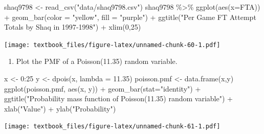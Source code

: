 \documentclass[
  11pt,
]{book}
\newenvironment{Shaded}{\begin{snugshade}}{\end{snugshade}}
\newcommand{\AttributeTok}[1]{\textcolor[rgb]{0.77,0.63,0.00}{#1}}
\newcommand{\DecValTok}[1]{\textcolor[rgb]{0.00,0.00,0.81}{#1}}
\newcommand{\FloatTok}[1]{\textcolor[rgb]{0.00,0.00,0.81}{#1}}
\newcommand{\FunctionTok}[1]{\textcolor[rgb]{0.00,0.00,0.00}{#1}}
\newcommand{\NormalTok}[1]{#1}
\newcommand{\OtherTok}[1]{\textcolor[rgb]{0.56,0.35,0.01}{#1}}
\newcommand{\SpecialCharTok}[1]{\textcolor[rgb]{0.00,0.00,0.00}{#1}}
\newcommand{\StringTok}[1]{\textcolor[rgb]{0.31,0.60,0.02}{#1}}
\providecommand{\tightlist}{%
  \setlength{\itemsep}{0pt}\setlength{\parskip}{0pt}}
\theoremstyle{definition}
\theoremstyle{definition}
\theoremstyle{definition}
\theoremstyle{definition}
\theoremstyle{remark}
\begin{document}
\begin{Shaded}
\begin{Highlighting}[]
\NormalTok{shaq9798 }\OtherTok{\textless{}{-}} \FunctionTok{read\_csv}\NormalTok{(}\StringTok{"data/shaq9798.csv"}\NormalTok{)}
\NormalTok{shaq9798 }\SpecialCharTok{\%\textgreater{}\%} \FunctionTok{ggplot}\NormalTok{(}\FunctionTok{aes}\NormalTok{(}\AttributeTok{x=}\NormalTok{FTA))  }\SpecialCharTok{+} 
  \FunctionTok{geom\_bar}\NormalTok{(}\AttributeTok{color =} \StringTok{"yellow"}\NormalTok{, }\AttributeTok{fill =} \StringTok{"purple"}\NormalTok{) }\SpecialCharTok{+}
  \FunctionTok{ggtitle}\NormalTok{(}\StringTok{"Per Game FT Attempt Totals by Shaq in 1997{-}1998"}\NormalTok{) }\SpecialCharTok{+}
  \FunctionTok{xlim}\NormalTok{(}\DecValTok{0}\NormalTok{,}\DecValTok{25}\NormalTok{)}
\end{Highlighting}
\end{Shaded}

\texttt{[image: textbook\_files/figure-latex/unnamed-chunk-60-1.pdf]}

\newpage

\begin{enumerate}
\def\labelenumi{(\alph{enumi})}
\setcounter{enumi}{1}
\tightlist
\item
  Plot the PMF of a Poisson(11.35) random variable.
\end{enumerate}

\begin{Shaded}
\begin{Highlighting}[]
\NormalTok{x }\OtherTok{\textless{}{-}} \DecValTok{0}\SpecialCharTok{:}\DecValTok{25}
\NormalTok{y }\OtherTok{\textless{}{-}} \FunctionTok{dpois}\NormalTok{(x, }\AttributeTok{lambda =} \FloatTok{11.35}\NormalTok{)}
\NormalTok{poisson.pmf }\OtherTok{\textless{}{-}} \FunctionTok{data.frame}\NormalTok{(x,y)}
\FunctionTok{ggplot}\NormalTok{(poisson.pmf, }\FunctionTok{aes}\NormalTok{(x, y)) }\SpecialCharTok{+} 
  \FunctionTok{geom\_bar}\NormalTok{(}\AttributeTok{stat=}\StringTok{"identity"}\NormalTok{) }\SpecialCharTok{+} 
  \FunctionTok{ggtitle}\NormalTok{(}\StringTok{"Probability mass function of Poisson(11.35) random variable"}\NormalTok{) }\SpecialCharTok{+}
  \FunctionTok{xlab}\NormalTok{(}\StringTok{"Value"}\NormalTok{) }\SpecialCharTok{+}
  \FunctionTok{ylab}\NormalTok{(}\StringTok{"Probability"}\NormalTok{)}
\end{Highlighting}
\end{Shaded}

\texttt{[image: textbook\_files/figure-latex/unnamed-chunk-61-1.pdf]}
\end{document}

